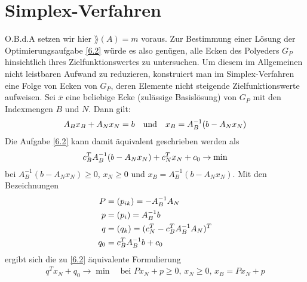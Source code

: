 \section{Simplex-Verfahren}

O.B.d.A setzen wir hier $\rang(A)=m$ voraus. Zur Bestimmung einer Lösung der Optimierungsaufgabe \cref{6.2} würde es also genügen, alle Ecken des Polyeders $G_P$ hinsichtlich ihres Zielfunktionswertes zu untersuchen. Um diesem im Allgemeinen nicht leistbaren Aufwand zu reduzieren, konstruiert man im Simplex-Verfahren eine Folge von Ecken von $G_P$, deren Elemente nicht steigende Zielfunktionswerte aufweisen. Sei $\overline{x}$ eine beliebige Ecke (zulässige Basislösung) von $G_P$ mit den Indexmengen $B$ und $N$. Dann gilt:
\begin{align}
	A_Bx_B + A_Nx_N = b\quad\text{und}\quad x_B=A_B^{-1}(b-A_Nx_N)\notag
\end{align}
Die Aufgabe \cref{6.2} kann damit äquivalent geschrieben werden als
\begin{align}
	c_B^TA_B^{-1}(b-A_Nx_N) + c_N^Tx_N+c_0\to\min \notag
\end{align}
bei $A^{-1}_B(b-A_Nx_N)\ge 0$, $x_N\ge 0$ und $x_B=A^{-1}_B(b-A_Nx_N)$. Mit den Bezeichnungen
\begin{align}
	P &= (p_{ik}) = -A_B^{-1}A_N \notag \\
	p &= (p_i) = A_B^{-1}b \notag \\
	q &= (q_k) = (c_N^T-c_B^TA_B^{-1}A_N)^T \notag \\
	q_0 &= c_B^TA_B^{-1}b+c_0 \notag
\end{align}
ergibt sich die zu \cref{6.2} äquivalente Formulierung
\begin{align}
	\label{6.5}
	q^Tx_N+q_0\to\min\quad\text{bei } Px_N+p\ge 0,\, x_N\ge 0,\, x_B=Px_N+p
\end{align}


